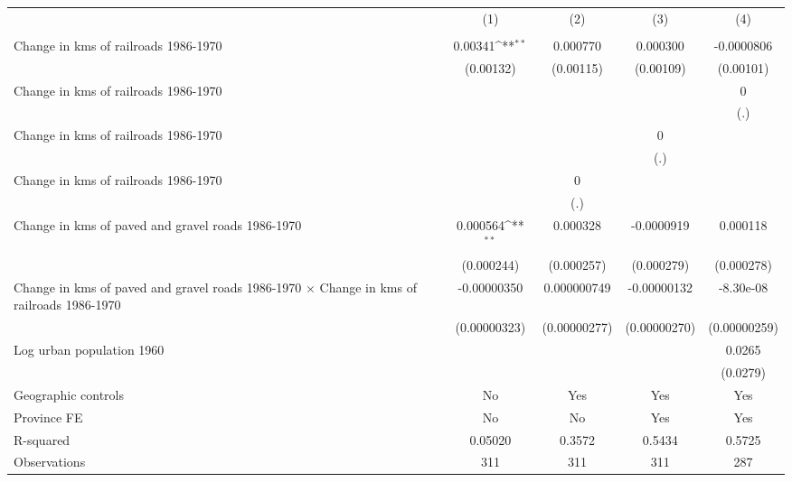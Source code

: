 {
\def\sym#1{\ifmmode^{#1}\else\(^{#1}\)\fi}
\begin{tabular}{l*{4}{c}}
\hline\hline
                &\multicolumn{1}{c}{(1)}&\multicolumn{1}{c}{(2)}&\multicolumn{1}{c}{(3)}&\multicolumn{1}{c}{(4)}\\
                &\multicolumn{1}{c}{}&\multicolumn{1}{c}{}&\multicolumn{1}{c}{}&\multicolumn{1}{c}{}\\
\hline
Change in kms of railroads 1986-1970&  0.00341\sym{**} & 0.000770         & 0.000300         &-0.0000806         \\
                &(0.00132)         &(0.00115)         &(0.00109)         &(0.00101)         \\
[1em]
Change in kms of railroads 1986-1970&                  &                  &                  &        0         \\
                &                  &                  &                  &      (.)         \\
[1em]
Change in kms of railroads 1986-1970&                  &                  &        0         &                  \\
                &                  &                  &      (.)         &                  \\
[1em]
Change in kms of railroads 1986-1970&                  &        0         &                  &                  \\
                &                  &      (.)         &                  &                  \\
[1em]
Change in kms of paved and gravel roads 1986-1970& 0.000564\sym{**} & 0.000328         &-0.0000919         & 0.000118         \\
                &(0.000244)         &(0.000257)         &(0.000279)         &(0.000278)         \\
[1em]
Change in kms of paved and gravel roads 1986-1970 $\times$ Change in kms of railroads 1986-1970&-0.00000350         &0.000000749         &-0.00000132         &-8.30e-08         \\
                &(0.00000323)         &(0.00000277)         &(0.00000270)         &(0.00000259)         \\
[1em]
Log urban population 1960&                  &                  &                  &   0.0265         \\
                &                  &                  &                  & (0.0279)         \\
\hline
Geographic controls&       No         &      Yes         &      Yes         &      Yes         \\
Province FE     &       No         &       No         &      Yes         &      Yes         \\
R-squared       &  0.05020         &   0.3572         &   0.5434         &   0.5725         \\
Observations    &      311         &      311         &      311         &      287         \\
\hline\hline
\end{tabular}
}
